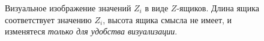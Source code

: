 \documentclass[letterpaper, 11pt]{article}
\begin{document}
\begin{figure}[H]
  \caption{Визуальное изображение значений $Z_i$ в виде $Z$-ящиков. Длина ящика соответствует значению $Z_i$, высота ящика смысла не имеет, и изменятеся \textit{только для удобства визуализации}.}
\end{figure}
\end{document}
